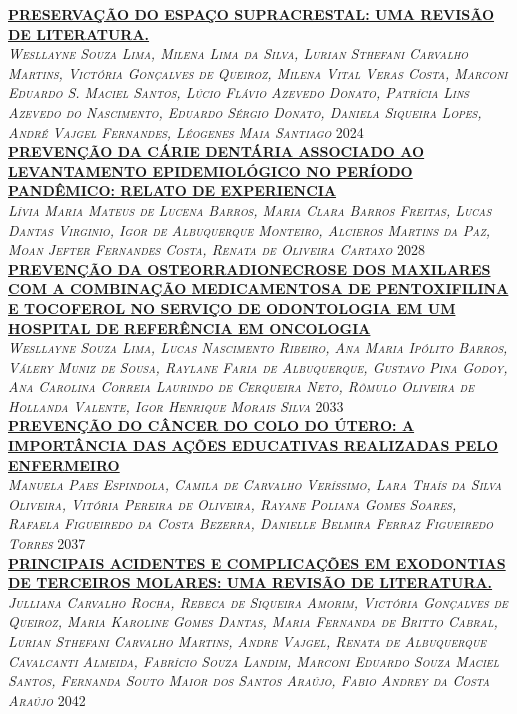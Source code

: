 \noindent \textsc{\hyperlink{trabalhos/249724.pdf.1}{\textbf{PRESERVAÇÃO DO ESPAÇO SUPRACRESTAL: UMA REVISÃO DE LITERATURA.}}}\\ 
\noindent \textsc{\textit{Wesllayne Souza Lima, Milena Lima da Silva, Lurian Sthefani Carvalho Martins, Victória Gonçalves de Queiroz, Milena Vital Veras Costa, Marconi Eduardo S. Maciel Santos, Lúcio Flávio Azevedo Donato, Patrícia Lins Azevedo do Nascimento, Eduardo Sérgio Donato, Daniela Siqueira Lopes, André Vajgel Fernandes, Léogenes Maia Santiago}} \hfill 2024\\ 

\noindent \textsc{\hyperlink{trabalhos/251123.pdf.1}{\textbf{PREVENÇÃO DA CÁRIE DENTÁRIA ASSOCIADO AO LEVANTAMENTO EPIDEMIOLÓGICO NO PERÍODO PANDÊMICO: RELATO DE EXPERIENCIA}}}\\ 
\noindent \textsc{\textit{Lívia Maria Mateus de Lucena Barros, Maria Clara Barros Freitas, Lucas Dantas Virginio, Igor de Albuquerque Monteiro, Alcieros Martins da Paz, Moan Jefter Fernandes Costa, Renata de Oliveira Cartaxo}} \hfill 2028\\ 

\noindent \textsc{\hyperlink{trabalhos/249495.pdf.1}{\textbf{PREVENÇÃO DA OSTEORRADIONECROSE DOS MAXILARES COM A COMBINAÇÃO MEDICAMENTOSA DE PENTOXIFILINA E TOCOFEROL NO SERVIÇO DE ODONTOLOGIA EM UM HOSPITAL DE REFERÊNCIA EM ONCOLOGIA}}}\\ 
\noindent \textsc{\textit{Wesllayne Souza Lima, Lucas Nascimento Ribeiro, Ana Maria Ipólito Barros, Válery Muniz de Sousa, Raylane Faria de Albuquerque, Gustavo Pina Godoy, Ana Carolina Correia Laurindo de Cerqueira Neto, Rômulo Oliveira de Hollanda Valente, Igor Henrique Morais Silva}} \hfill 2033\\ 

\noindent \textsc{\hyperlink{trabalhos/250502.pdf.1}{\textbf{PREVENÇÃO DO CÂNCER DO COLO DO ÚTERO: A IMPORTÂNCIA DAS AÇÕES EDUCATIVAS REALIZADAS PELO ENFERMEIRO}}}\\ 
\noindent \textsc{\textit{Manuela Paes Espindola, Camila de Carvalho Veríssimo, Lara Thaís da Silva Oliveira, Vitória Pereira de Oliveira, Rayane Poliana Gomes Soares, Rafaela Figueiredo da Costa Bezerra, Danielle Belmira Ferraz Figueiredo Torres}} \hfill 2037\\ 

\noindent \textsc{\hyperlink{trabalhos/250267.pdf.1}{\textbf{PRINCIPAIS ACIDENTES E COMPLICAÇÕES EM EXODONTIAS DE TERCEIROS MOLARES: UMA REVISÃO DE LITERATURA.}}}\\ 
\noindent \textsc{\textit{Julliana Carvalho Rocha, Rebeca de Siqueira Amorim, Victória Gonçalves de Queiroz, Maria Karoline Gomes Dantas, Maria Fernanda de Britto Cabral, Lurian Sthefani Carvalho Martins, Andre Vajgel, Renata de Albuquerque Cavalcanti Almeida, Fabrício Souza Landim, Marconi Eduardo Souza Maciel Santos, Fernanda Souto Maior dos Santos Araújo, Fabio Andrey da Costa Araújo}} \hfill 2042\\ 

